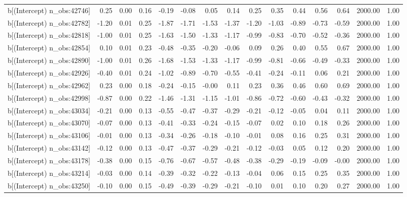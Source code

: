 \begin{table}[ht]
\begin{tabular}{rrrrrrrrrrrrrrr}
  b[(Intercept) n\_obs:42746] & 0.25 & 0.00 & 0.16 & -0.19 & -0.08 & 0.05 & 0.14 & 0.25 & 0.35 & 0.44 & 0.56 & 0.64 & 2000.00 & 1.00 \\ 
  b[(Intercept) n\_obs:42782] & -1.20 & 0.01 & 0.25 & -1.87 & -1.71 & -1.53 & -1.37 & -1.20 & -1.03 & -0.89 & -0.73 & -0.59 & 2000.00 & 1.00 \\ 
  b[(Intercept) n\_obs:42818] & -1.00 & 0.01 & 0.25 & -1.63 & -1.50 & -1.33 & -1.17 & -0.99 & -0.83 & -0.70 & -0.52 & -0.36 & 2000.00 & 1.00 \\ 
  b[(Intercept) n\_obs:42854] & 0.10 & 0.01 & 0.23 & -0.48 & -0.35 & -0.20 & -0.06 & 0.09 & 0.26 & 0.40 & 0.55 & 0.67 & 2000.00 & 1.00 \\ 
  b[(Intercept) n\_obs:42890] & -1.00 & 0.01 & 0.26 & -1.68 & -1.53 & -1.33 & -1.17 & -0.99 & -0.81 & -0.66 & -0.49 & -0.33 & 2000.00 & 1.00 \\ 
  b[(Intercept) n\_obs:42926] & -0.40 & 0.01 & 0.24 & -1.02 & -0.89 & -0.70 & -0.55 & -0.41 & -0.24 & -0.11 & 0.06 & 0.21 & 2000.00 & 1.00 \\ 
  b[(Intercept) n\_obs:42962] & 0.23 & 0.00 & 0.18 & -0.24 & -0.15 & -0.00 & 0.11 & 0.23 & 0.36 & 0.46 & 0.60 & 0.69 & 2000.00 & 1.00 \\ 
  b[(Intercept) n\_obs:42998] & -0.87 & 0.00 & 0.22 & -1.46 & -1.31 & -1.15 & -1.01 & -0.86 & -0.72 & -0.60 & -0.43 & -0.32 & 2000.00 & 1.00 \\ 
  b[(Intercept) n\_obs:43034] & -0.21 & 0.00 & 0.13 & -0.55 & -0.47 & -0.37 & -0.29 & -0.21 & -0.12 & -0.05 & 0.04 & 0.11 & 2000.00 & 1.00 \\ 
  b[(Intercept) n\_obs:43070] & -0.07 & 0.00 & 0.13 & -0.41 & -0.33 & -0.24 & -0.15 & -0.07 & 0.02 & 0.10 & 0.18 & 0.26 & 2000.00 & 1.00 \\ 
  b[(Intercept) n\_obs:43106] & -0.01 & 0.00 & 0.13 & -0.34 & -0.26 & -0.18 & -0.10 & -0.01 & 0.08 & 0.16 & 0.25 & 0.31 & 2000.00 & 1.00 \\ 
  b[(Intercept) n\_obs:43142] & -0.12 & 0.00 & 0.13 & -0.47 & -0.37 & -0.29 & -0.21 & -0.12 & -0.03 & 0.05 & 0.12 & 0.20 & 2000.00 & 1.00 \\ 
  b[(Intercept) n\_obs:43178] & -0.38 & 0.00 & 0.15 & -0.76 & -0.67 & -0.57 & -0.48 & -0.38 & -0.29 & -0.19 & -0.09 & -0.00 & 2000.00 & 1.00 \\ 
  b[(Intercept) n\_obs:43214] & -0.03 & 0.00 & 0.14 & -0.39 & -0.32 & -0.22 & -0.13 & -0.04 & 0.06 & 0.15 & 0.25 & 0.35 & 2000.00 & 1.00 \\ 
  b[(Intercept) n\_obs:43250] & -0.10 & 0.00 & 0.15 & -0.49 & -0.39 & -0.29 & -0.21 & -0.10 & 0.01 & 0.10 & 0.20 & 0.27 & 2000.00 & 1.00 \\ 

\end{tabular}
\end{table}
